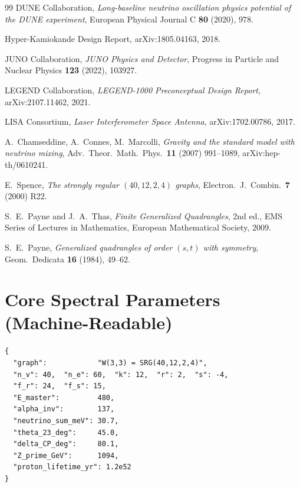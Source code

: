 \documentclass[12pt,a4paper]{article}
\begin{document}
\begin{thebibliography}{99}
DUNE Collaboration,
\textit{Long-baseline neutrino oscillation physics potential of the
DUNE experiment},
European Physical Journal C \textbf{80} (2020), 978.

Hyper-Kamiokande Design Report, arXiv:1805.04163, 2018.

JUNO Collaboration,
\textit{JUNO Physics and Detector},
Progress in Particle and Nuclear Physics \textbf{123} (2022), 103927.

LEGEND Collaboration,
\textit{LEGEND-1000 Preconceptual Design Report},
arXiv:2107.11462, 2021.

LISA Consortium,
\textit{Laser Interferometer Space Antenna},
arXiv:1702.00786, 2017.

A.~Chamseddine, A.~Connes, M.~Marcolli,
\textit{Gravity and the standard model with neutrino mixing},
Adv.\ Theor.\ Math.\ Phys.\ \textbf{11} (2007) 991--1089,
arXiv:hep-th/0610241.

E.~Spence,
\textit{The strongly regular $(40,12,2,4)$ graphs},
Electron.\ J.\ Combin.\ \textbf{7} (2000) R22.

S.~E.~Payne and J.~A.~Thas,
\textit{Finite Generalized Quadrangles},
2nd ed., EMS Series of Lectures in Mathematics,
European Mathematical Society, 2009.

S.~E.~Payne,
\textit{Generalized quadrangles of order $(s,t)$ with symmetry},
Geom.\ Dedicata \textbf{16} (1984), 49--62.

\end{thebibliography}

\appendix

\section{Core Spectral Parameters (Machine-Readable)}
\label{app:params}

\begin{verbatim}
{
  "graph":            "W(3,3) = SRG(40,12,2,4)",
  "n_v": 40,  "n_e": 60,  "k": 12,  "r": 2,  "s": -4,
  "f_r": 24,  "f_s": 15,
  "E_master":         480,
  "alpha_inv":        137,
  "neutrino_sum_meV": 30.7,
  "theta_23_deg":     45.0,
  "delta_CP_deg":     80.1,
  "Z_prime_GeV":      1094,
  "proton_lifetime_yr": 1.2e52
}
\end{verbatim}
\end{document}
